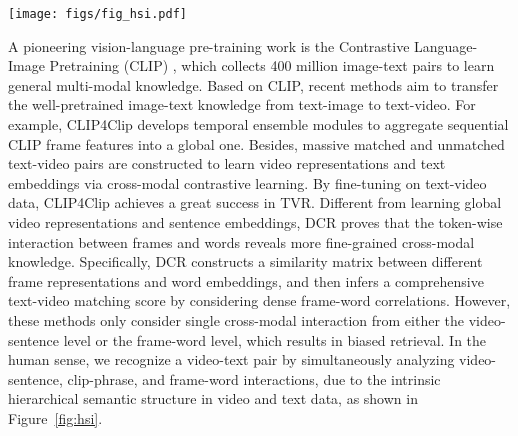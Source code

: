 \documentclass{article}
\begin{document}
\begin{figure*}[h]
    \centering
    \texttt{[image: figs/fig\_hsi.pdf]}
    \caption{HCMI measures the semantic similarity between a video and a sentence by considering multi-level interactions at frame-word, clip-phrase, and video-sentence granularities, simultaneously. Both visual and text aggregation modules adopt the same architecture, which is given in the right column. FC indicates the fully connected layer. 
    The visual and text encoders adopt standard CLIP architectures in \cite{radford2021learning},~\emph{e.g.,}  for CLIP with ViT-B/16.}
    \label{fig:hsi}
\end{figure*}

 
A pioneering vision-language pre-training work is the Contrastive Language-Image Pretraining (CLIP) \cite{radford2021learning}, which collects 400 million image-text pairs to learn general multi-modal knowledge.
Based on CLIP, recent methods \cite{luo2021clip4clip,gao2021clip2tv,wang2022disentangled,cheng2021improving} aim to transfer the well-pretrained image-text knowledge from text-image to text-video.
For example, CLIP4Clip \cite{luo2021clip4clip} develops temporal ensemble modules to aggregate sequential CLIP frame features into a global one.
Besides, massive matched and unmatched text-video pairs are constructed to learn video representations and text embeddings via cross-modal contrastive learning. 
By fine-tuning on text-video data, CLIP4Clip achieves a great success in TVR.
Different from learning global video representations and sentence embeddings, DCR \cite{wang2022disentangled} proves that the token-wise interaction between frames and words reveals more fine-grained cross-modal knowledge.
Specifically, DCR constructs a similarity matrix between different frame representations and word embeddings, and then infers a comprehensive text-video matching score by considering dense frame-word correlations.
However, these methods only consider single cross-modal interaction from either the video-sentence level or the frame-word level, which results in biased retrieval.
In the human sense, we recognize a video-text pair by simultaneously analyzing video-sentence, clip-phrase, and frame-word interactions, due to the intrinsic hierarchical semantic structure in video and text data, as shown in Figure~\ref{fig:hsi}.
\end{document}
